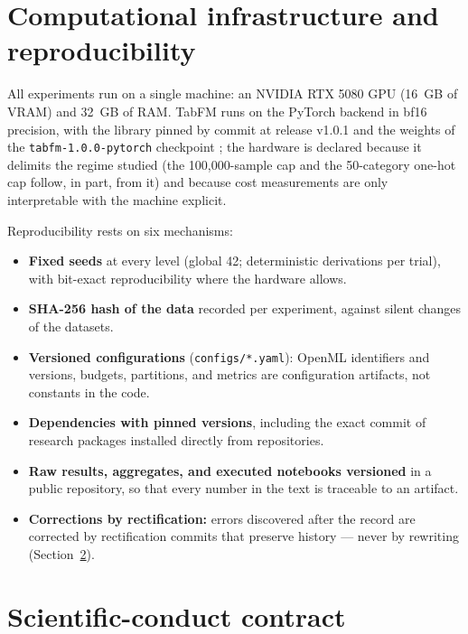 \section{Computational infrastructure and reproducibility}
\label{sec:met-reprodutibilidade}

All experiments run on a single machine: an NVIDIA RTX 5080 GPU
(16~GB of VRAM) and 32~GB of RAM. TabFM runs on the PyTorch backend
in bf16 precision, with the library pinned by commit at release
v1.0.1 and the weights of the \texttt{tabfm-1.0.0-pytorch}
checkpoint \citep{tabfm2026}; the hardware is declared because it
delimits the regime studied (the 100{,}000-sample cap and the
50-category one-hot cap follow, in part, from it) and because cost
measurements are only interpretable with the machine explicit.

Reproducibility rests on six mechanisms:

\begin{itemize}
  \item \textbf{Fixed seeds} at every level (global 42;
    deterministic derivations per trial), with bit-exact
    reproducibility where the hardware allows.
  \item \textbf{SHA-256 hash of the data} recorded per experiment,
    against silent changes of the datasets.
  \item \textbf{Versioned configurations} (\texttt{configs/*.yaml}):
    OpenML identifiers and versions, budgets, partitions, and
    metrics are configuration artifacts, not constants in the code.
  \item \textbf{Dependencies with pinned versions}, including the
    exact commit of research packages installed directly from
    repositories.
  \item \textbf{Raw results, aggregates, and executed notebooks
    versioned} in a public repository, so that every number in the
    text is traceable to an artifact.
  \item \textbf{Corrections by rectification:} errors discovered
    after the record are corrected by rectification commits that
    preserve history --- never by rewriting
    (Section~\ref{sec:met-conduta}).
\end{itemize}

\section{Scientific-conduct contract}
\label{sec:met-conduta}

